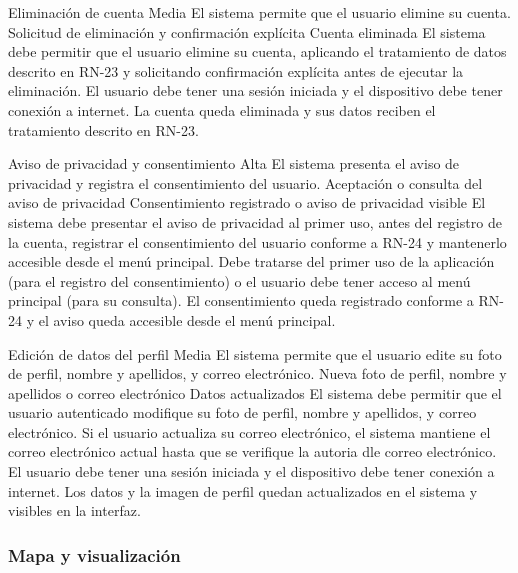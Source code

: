   {Eliminación de cuenta}%
  {Media}%
  {El sistema permite que el usuario elimine su cuenta.}%
  {Solicitud de eliminación y confirmación explícita}%
  {Cuenta eliminada}%
  {El sistema debe permitir que el usuario elimine su cuenta, aplicando el tratamiento de datos descrito en RN-23 y solicitando confirmación explícita antes de ejecutar la eliminación.}%
  {El usuario debe tener una sesión iniciada y el dispositivo debe tener conexión a internet.}%
  {La cuenta queda eliminada y sus datos reciben el tratamiento descrito en RN-23.}%

  {Aviso de privacidad y consentimiento}%
  {Alta}%
  {El sistema presenta el aviso de privacidad y registra el consentimiento del usuario.}%
  {Aceptación o consulta del aviso de privacidad}%
  {Consentimiento registrado o aviso de privacidad visible}%
  {El sistema debe presentar el aviso de privacidad al primer uso, antes del registro de la cuenta, registrar el consentimiento del usuario conforme a RN-24 y mantenerlo accesible desde el menú principal.}%
  {Debe tratarse del primer uso de la aplicación (para el registro del consentimiento) o el usuario debe tener acceso al menú principal (para su consulta).}%
  {El consentimiento queda registrado conforme a RN-24 y el aviso queda accesible desde el menú principal.}%

  {Edición de datos del perfil}%
  {Media}%
  {El sistema permite que el usuario edite su foto de perfil, nombre y apellidos, y correo electrónico.}%
  {Nueva foto de perfil, nombre y apellidos o correo electrónico}%
  {Datos actualizados}%
  {El sistema debe permitir que el usuario autenticado modifique su foto de perfil, nombre y apellidos, y correo electrónico. Si el usuario actualiza su correo electrónico, el sistema mantiene el correo electrónico actual hasta que se verifique la autoria dle correo electrónico.}%
  {El usuario debe tener una sesión iniciada y el dispositivo debe tener conexión a internet.}%
  {Los datos y la imagen de perfil quedan actualizados en el sistema y visibles en la interfaz.}%

\subsubsection{Mapa y visualización}

